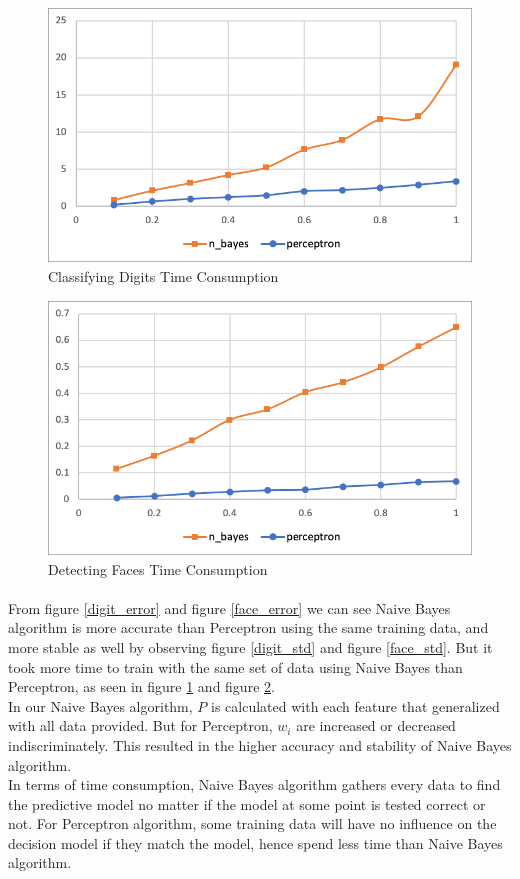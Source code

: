 \documentclass{article}
\begin{document}
\begin{figure}
\includegraphics[width = 1\textwidth]{digit_time.png}
\caption{Classifying Digits Time Consumption}
\label{digit_time}
\end{figure}

\begin{figure}
\includegraphics[width = 1\textwidth]{face_time.png}
\caption{Detecting Faces Time Consumption}
\label{face_time}
\end{figure}

\newpage
\paragraph*{}
From figure \ref{digit_error} and figure \ref{face_error} we can see Naive Bayes algorithm is more accurate than Perceptron using the same training data, and more stable as well by observing figure \ref{digit_std} and figure \ref{face_std}. But it took more time to train with the same set of data using Naive Bayes than Perceptron, as seen in figure \ref{digit_time} and figure \ref{face_time}.\\
In our Naive Bayes algorithm, $P$ is calculated with each feature that generalized with all data provided. But for Perceptron, $w_i$ are increased or decreased indiscriminately. This resulted in the higher accuracy and stability of Naive Bayes algorithm.\\
In terms of time consumption, Naive Bayes algorithm gathers every data to find the predictive model no matter if the model at some point is tested correct or not. For Perceptron algorithm, some training data will have no influence on the decision model if they match the model, hence spend less time than Naive Bayes algorithm.\\
\end{document}
